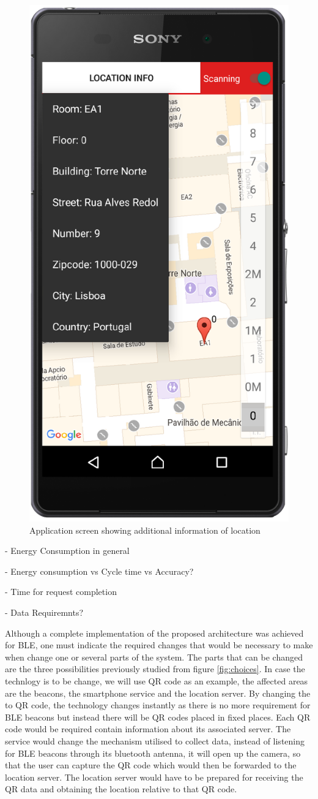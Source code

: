 \documentclass[a4paper]{IEEEtran}
\begin{document}
\begin{figure}
	\centering
		\includegraphics[width=0.5\linewidth]{figures/app_focused_menu.png}
	\caption[Application screen showing additional information of location]{Application screen showing additional information of location}
	\label{fig:AppMenu}
\end{figure}




- Energy Consumption in general

- Energy consumption vs Cycle time vs Accuracy?

- Time for request completion

- Data Requiremnts?
 


Although a complete implementation of the proposed architecture was achieved for BLE, one must indicate the required changes that would be necessary to make when change one or several parts of the system. The parts that can be changed are the three possibilities previously studied from figure \ref{fig:choices}. In case the technlogy is to be change, we will use QR code as an example, the affected areas are the beacons, the smartphone service and the location server. By changing the to QR code, the technology changes instantly as there is no more requirement for BLE beacons but instead there will be QR codes placed in fixed places. Each QR code would be required contain information about its associated server. The service would change the mechanism utilised to collect data, instead of listening for BLE beacons through its bluetooth antenna, it will open up the camera, so that the user can capture the QR code which would then be forwarded to the location server. The location server would have to be prepared for receiving the QR data and obtaining the location relative to that QR code.
\end{document}
